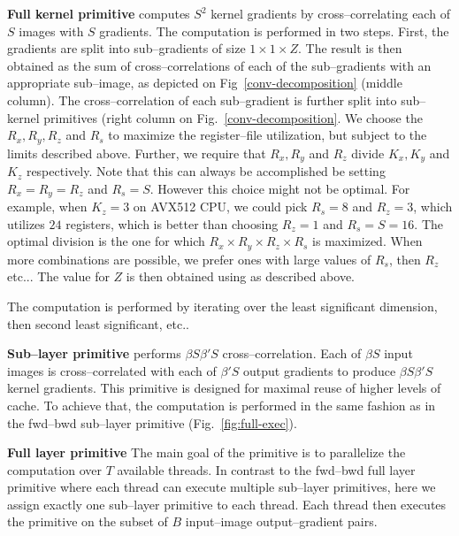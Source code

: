   {\bf Full kernel primitive} computes $S^2$ kernel gradients by
  cross--correlating each of $S$ images with $S$ gradients.  The
  computation is performed in two steps.  First, the gradients are
  split into sub--gradients of size $1 \times 1 \times Z$.  The result
  is then obtained as the sum of cross--correlations of each of the
  sub--gradients with an appropriate sub--image, as depicted on
  Fig~\ref{conv-decomposition} (middle column).  The
  cross--correlation of each sub--gradient is further split into
  sub--kernel primitives (right column on
  Fig.~\ref{conv-decomposition}.  We choose the $R_x, R_y, R_z$ and
  $R_s$ to maximize the register--file utilization, but subject to the
  limits described above.  Further, we require that $R_x, R_y$ and
  $R_z$ divide $K_x, K_y$ and $K_z$ respectively.  Note that this can
  always be accomplished be setting $R_x=R_y=R_z$ and $R_s=S$.
  However this choice might not be optimal.  For example, when $K_z=3$
  on AVX512 CPU, we could pick $R_s=8$ and $R_z=3$, which utilizes
  $24$ registers, which is better than choosing $R_z=1$ and
  $R_s=S=16$.  The optimal division is the one for which $R_x \times
  R_y \times R_z \times R_s$ is maximized.  When more combinations are
  possible, we prefer ones with large values of $R_s$, then $R_z$
  etc...  The value for $Z$ is then obtained using as described above.

  The computation is performed by iterating over the least significant
  dimension, then second least significant, etc..

  {\bf Sub--layer primitive} performs $\beta S \beta' S$
  cross--correlation.  Each of $\beta S$ input images is
  cross--correlated with each of $\beta'S$ output gradients to produce
  $\beta S \beta' S$ kernel gradients.  This primitive is designed for
  maximal reuse of higher levels of cache.  To achieve that, the
  computation is performed in the same fashion as in the fwd--bwd
  sub--layer primitive (Fig.~\ref{fig:full-exec}).

  {\bf Full layer primitive} \quad The main goal of the primitive is
  to parallelize the computation over $T$ available threads.  In
  contrast to the fwd--bwd full layer primitive where each thread can
  execute multiple sub--layer primitives, here we assign exactly one
  sub--layer primitive to each thread.  Each thread then executes the
  primitive on the subset of $B$ input--image output--gradient pairs.

